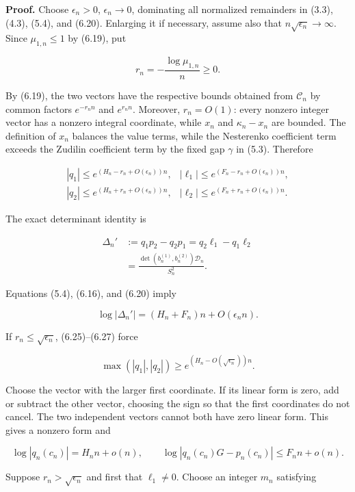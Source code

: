 \documentclass[
  11pt,
]{article}
\begin{document}
\textbf{Proof.} Choose \(\epsilon_n>0\), \(\epsilon_n\to0\), dominating
all normalized remainders in (3.3), (4.3), (5.4), and (6.20). Enlarging
it if necessary, assume also that \(n\sqrt{\epsilon_n}\to\infty\). Since
\(\mu_{1,n}\le1\) by (6.19), put

\[
 r_n=-\frac{\log\mu_{1,n}}n\ge0.
\]

By (6.19), the two vectors have the respective bounds obtained from
\(\mathcal C_n\) by common factors \(e^{-r_nn}\) and \(e^{r_nn}\).
Moreover, \(r_n=O(1)\): every nonzero integer vector has a nonzero
integral coordinate, while \(x_n\) and \(\kappa_n-x_n\) are bounded. The
definition of \(x_n\) balances the value terms, while the Nesterenko
coefficient term exceeds the Zudilin coefficient term by the fixed gap
\(\gamma\) in (5.3). Therefore

\[
 \begin{array}{ll}
 |q_1|\le e^{(H_n-r_n+O(\epsilon_n))n},&
 |\ell_1|\le e^{(F_n-r_n+O(\epsilon_n))n},\\
 |q_2|\le e^{(H_n+r_n+O(\epsilon_n))n},&
 |\ell_2|\le e^{(F_n+r_n+O(\epsilon_n))n}.
 \end{array}                                         \tag{6.25}
\]

The exact determinant identity is

\[
 \begin{aligned}
 \Delta_n'&:=q_1p_2-q_2p_1=q_2\ell_1-q_1\ell_2\\
 &=\frac{\det(b_n^{(1)},b_n^{(2)})\mathcal D_n}{S_n^2}.
 \end{aligned}                                       \tag{6.26}
\]

Equations (5.4), (6.16), and (6.20) imply

\[
 \log|\Delta_n'|=(H_n+F_n)n+O(\epsilon_nn).          \tag{6.27}
\]

If \(r_n\le\sqrt{\epsilon_n}\), (6.25)--(6.27) force

\[
 \max(|q_1|,|q_2|)\ge e^{(H_n-O(\sqrt{\epsilon_n}))n}.
\]

Choose the vector with the larger first coordinate. If its linear form
is zero, add or subtract the other vector, choosing the sign so that the
first coordinates do not cancel. The two independent vectors cannot both
have zero linear form. This gives a nonzero form and

\[
 \log|q_n(c_n)|=H_nn+o(n),\qquad
 \log|q_n(c_n)G-p_n(c_n)|\le F_nn+o(n).              \tag{6.28}
\]

Suppose \(r_n>\sqrt{\epsilon_n}\) and first that \(\ell_1\ne0\). Choose
an integer \(m_n\) satisfying
\end{document}
